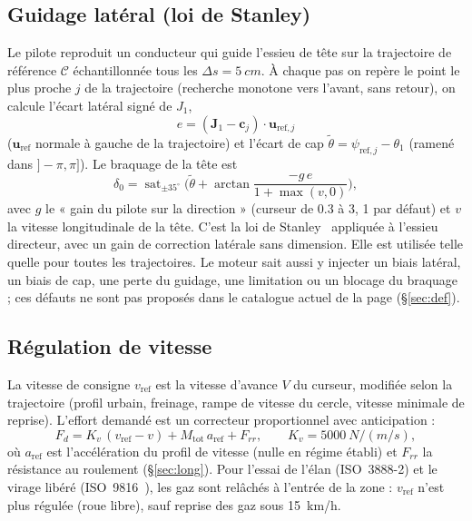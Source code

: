 \documentclass[11pt,a4paper]{article}
\newcommand{\vect}[1]{\bm{#1}}
\begin{document}
\subsection{Guidage latéral (loi de Stanley)}\label{sec:stanley}
Le pilote reproduit un conducteur qui guide l'essieu de tête sur la trajectoire de référence $\mathcal C$ échantillonnée tous les $\Delta s=\SI{5}{cm}$. À chaque pas on repère le point le plus proche $j$ de la trajectoire (recherche monotone vers l'avant, sans retour), on calcule l'écart latéral signé de $J_1$,
\begin{equation}
 e=(\vect J_1-\vect c_j)\cdot\vect u_{\text{ref},j}
\end{equation}
($\vect u_{\text{ref}}$ normale à gauche de la trajectoire) et l'écart de cap $\tilde\theta=\psi_{\text{ref},j}-\theta_1$ (ramené dans $]-\pi,\pi]$). Le braquage de la tête est
\begin{equation}
 \delta_0=\operatorname{sat}_{\pm35^\circ}\!\Big(\tilde\theta+\arctan\frac{-g\,e}{1+\max(v,0)}\Big),
\end{equation}
avec $g$ le « gain du pilote sur la direction » (curseur de \num{0,3} à \num{3}, \num{1} par défaut) et $v$ la vitesse longitudinale de la tête. C'est la loi de Stanley~\cite{Thrun2006,Hoffmann2007} appliquée à l'essieu directeur, avec un gain de correction latérale sans dimension. Elle est utilisée telle quelle pour toutes les trajectoires. Le moteur sait aussi y injecter un biais latéral, un biais de cap, une perte du guidage, une limitation ou un blocage du braquage ; ces défauts ne sont pas proposés dans le catalogue actuel de la page (§\ref{sec:def}).

\subsection{Régulation de vitesse}\label{sec:pilot_long}
La vitesse de consigne $v_{\text{ref}}$ est la vitesse d'avance $V$ du curseur, modifiée selon la trajectoire (profil urbain, freinage, rampe de vitesse du cercle, vitesse minimale de reprise). L'effort demandé est un correcteur proportionnel avec anticipation :
\begin{equation}
 F_d=K_v\,(v_{\text{ref}}-v)+M_{\text{tot}}\,a_{\text{ref}}+F_{rr},\qquad K_v=\SI{5000}{N/(m/s)},
\end{equation}
où $a_{\text{ref}}$ est l'accélération du profil de vitesse (nulle en régime établi) et $F_{rr}$ la résistance au roulement (§\ref{sec:long}). Pour l'essai de l'élan (ISO~3888-2) et le virage libéré (ISO~9816~\cite{ISO9816}), les gaz sont relâchés à l'entrée de la zone : $v_{\text{ref}}$ n'est plus régulée (roue libre), sauf reprise des gaz sous \SI{15}{km/h}.
\end{document}
